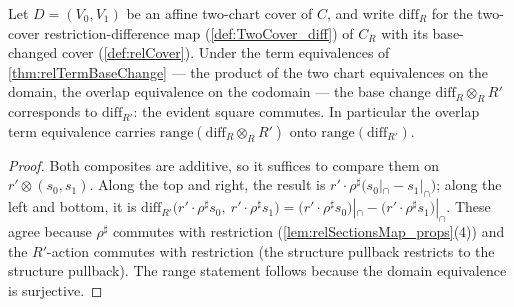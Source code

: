 \begin{lemma}
  \label{lem:relDiffBaseChange}
  \leanok
  Let \(D = (V_0, V_1)\) be an affine two-chart cover of \(C\), and write
  \(\mathrm{diff}_R\) for the two-cover restriction-difference map
  (\ref{def:TwoCover_diff}) of \(C_R\) with its base-changed cover
  (\ref{def:relCover}). Under the term equivalences of \ref{thm:relTermBaseChange} ---
  the product of the two chart equivalences on the domain, the overlap equivalence on the
  codomain --- the base change \(\mathrm{diff}_R \otimes_R R'\) corresponds to
  \(\mathrm{diff}_{R'}\): the evident square commutes. In particular the overlap term
  equivalence carries \(\mathrm{range}(\mathrm{diff}_R \otimes_R R')\) onto
  \(\mathrm{range}(\mathrm{diff}_{R'})\).
\end{lemma}
\begin{proof}
  \leanok
  Both composites are additive, so it suffices to compare them on
  \(r' \otimes (s_0, s_1)\). Along the top and right, the result is
  \(r' \cdot \rho^{\sharp}\bigl(s_0|_{\cap} - s_1|_{\cap}\bigr)\); along the left and
  bottom, it is \(\mathrm{diff}_{R'}\bigl(r' \cdot \rho^{\sharp} s_0,\ r' \cdot
  \rho^{\sharp} s_1\bigr) = \bigl(r' \cdot \rho^{\sharp} s_0\bigr)|_{\cap} -
  \bigl(r' \cdot \rho^{\sharp} s_1\bigr)|_{\cap}\). These agree because
  \(\rho^{\sharp}\) commutes with restriction (\ref{lem:relSectionsMap_props}(4)) and
  the \(R'\)-action commutes with restriction (the structure pullback restricts to the
  structure pullback). The range statement follows because the domain equivalence is
  surjective.
\end{proof}

